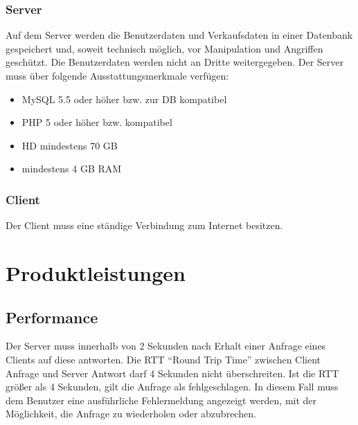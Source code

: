 \documentclass[a4paper,12pt,oneside]{scrartcl}
\begin{document}
\subsubsection*{Server}
Auf dem Server werden die Benutzerdaten und Verkaufsdaten in einer Datenbank gespeichert und, soweit technisch möglich, vor Manipulation und Angriffen geschützt.
Die Benutzerdaten werden nicht an Dritte weitergegeben.
Der Server muss über folgende Ausstattungsmerkmale verfügen:
\begin{itemize}
	\item MySQL 5.5 oder höher bzw. zur DB kompatibel
	\item PHP 5 oder höher bzw. kompatibel
	\item HD mindestens 70 GB
	\item mindestens 4 GB RAM
\end{itemize}

\subsubsection*{Client}
Der Client muss eine ständige Verbindung zum Internet besitzen.






\section{Produktleistungen}
\hypertarget{s07}{\subsection{Performance}}
Der Server muss innerhalb von 2 Sekunden nach Erhalt einer Anfrage eines Clients auf diese antworten.
Die RTT "`Round Trip Time"' zwischen Client Anfrage und Server Antwort darf 4 Sekunden nicht überschreiten.
Ist die RTT größer als 4 Sekunden, gilt die Anfrage als fehlgeschlagen.
In diesem Fall muss dem Benutzer eine ausführliche Fehlermeldung angezeigt werden, mit der Möglichkeit, die Anfrage zu wiederholen oder abzubrechen.
\end{document}
